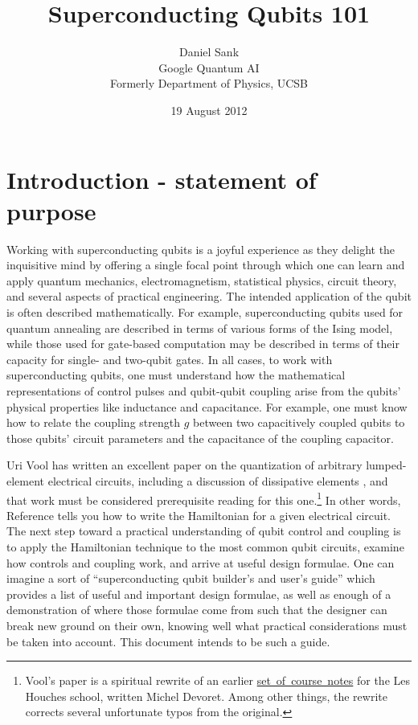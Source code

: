 \documentclass[twocolumn]{article}
\title{Superconducting Qubits 101}
\author{Daniel Sank \\
\small Google Quantum AI \\
\small Formerly Department of Physics, UCSB}
\date{19 August 2012}
\begin{document}
\maketitle
\tableofcontents

\section{Introduction - statement of purpose}

Working with superconducting qubits is a joyful experience as they delight the inquisitive mind by offering a single focal point through which one can learn and apply quantum mechanics, electromagnetism, statistical physics, circuit theory, and several aspects of practical engineering.
The intended application of the qubit is often described mathematically.
For example, superconducting qubits used for quantum annealing are described in terms of various forms of the Ising model, while those used for gate-based computation may be described in terms of their capacity for single- and two-qubit gates.
In all cases, to work with superconducting qubits, one must understand how the mathematical representations of control pulses and qubit-qubit coupling arise from the qubits' physical properties like inductance and capacitance.
For example, one must know how to relate the coupling strength $g$ between two capacitively coupled qubits to those qubits' circuit parameters and the capacitance of the coupling capacitor.

Uri Vool has written an excellent paper on the quantization of arbitrary lumped-element electrical circuits, including a discussion of dissipative elements \cite{Vool:quantumCircuits}, and that work must be considered prerequisite reading for this one.\footnote{Vool's paper is a spiritual rewrite of an earlier \mbox{\href{http://qulab.eng.yale.edu/documents/reprints/Houches_fluctuations.pdf}{set of course notes}} for the Les Houches school, written Michel Devoret. Among other things, the rewrite corrects several unfortunate typos from the original.}
In other words, Reference \cite{Vool:quantumCircuits} tells you how to write the Hamiltonian for a given electrical circuit.
The next step toward a practical understanding of qubit control and coupling is to apply the Hamiltonian technique to the most common qubit circuits, examine how controls and coupling work, and arrive at useful design formulae.
One can imagine a sort of ``superconducting qubit builder's and user's guide'' which provides a list of useful and important design formulae, as well as enough of a demonstration of where those formulae come from such that the designer can break new ground on their own, knowing well what practical considerations must be taken into account.
This document intends to be such a guide.
\end{document}
